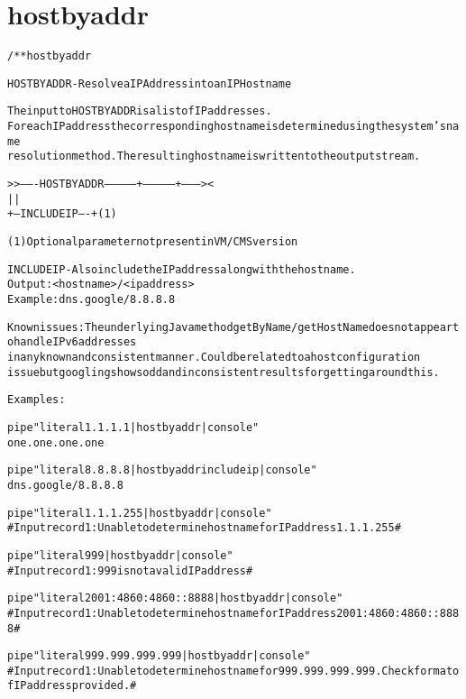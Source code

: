 \section{hostbyaddr}
\begin{shaded}
\begin{alltt}
/** hostbyaddr

  HOSTBYADDR - Resolve a IP Address into an IP Hostname
   
     The input to HOSTBYADDR is a list of IP addresses.  
     For each IP address the corresponding hostname is determined using the system's name
     resolution method.  The resulting hostname is written to the output stream.      
                                              
     >>-------HOSTBYADDR --------------+---------------+--------><
                                       |               |    
                                       +--INCLUDEIP----+  (1)   
   
   
     (1) Optional parameter not present in VM/CMS version
   
         INCLUDEIP          - Also include the IP address along with the hostname.
                                   Output:   <hostname>/<ip address>
                                   Example:  dns.google/8.8.8.8
   
     Known issues:  The underlying Java method getByName/getHostName does not appear to handle IPv6 addresses 
                    in any known and consistent manner.  Could be related to a host configuration
                    issue but googling shows odd and inconsistent results for getting around this.  
   
     Examples:
   
      pipe "literal 1.1.1.1 | hostbyaddr | console"
      one.one.one.one
   	  
      pipe "literal 8.8.8.8 | hostbyaddr includeip | console"
      dns.google/8.8.8.8
   
      pipe "literal 1.1.1.255 | hostbyaddr | console"
      # Input record 1: Unable to determine host name for IP address 1.1.1.255 #
      
      pipe "literal 999 | hostbyaddr | console"
      # Input record 1: 999 is not a valid IP address #
   	  
      pipe "literal 2001:4860:4860::8888 | hostbyaddr | console" 
      # Input record 1: Unable to determine host name for IP address 2001:4860:4860::8888 #
   
      pipe "literal 999.999.999.999 | hostbyaddr | console"
      # Input record 1: Unable to determine host name for 999.999.999.999 . Check format of IP address provided. #


\end{alltt}
\end{shaded}
